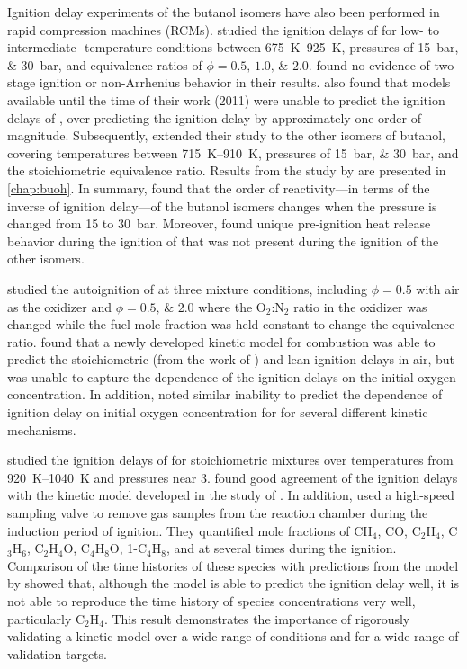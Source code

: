 \documentclass[../main.tex]{subfiles}
\begin{document}
Ignition delay experiments of the butanol isomers have also been
performed in rapid compression machines (RCMs). \textcite{Weber2011}
studied the ignition delays of \nBuOH{} for low- to intermediate-%
temperature conditions between \SIrange{675}{925}{\kelvin}, pressures of
\SIlist{15;30}{\bar}, and equivalence ratios of $\phi = \numlist{0.5;1.0;2.0}$.
\textcite{Weber2011} found no evidence of two-stage ignition or
non-Arrhenius behavior in their results. \textcite{Weber2011} also found
that models available until the time of their work (2011) were unable
to predict the ignition delays of \nBuOH{}, over-predicting
the ignition delay by approximately one order of magnitude. Subsequently,
\textcite{Weber2013} extended their study to the other isomers of
butanol, covering temperatures between \SIrange{715}{910}{\kelvin},
pressures of \SIlist{15;30}{\bar}, and the stoichiometric equivalence
ratio. Results from the study by \textcite{Weber2013} are presented in
\autoref{chap:buoh}. In summary, \textcite{Weber2013} found that the order of
reactivity---in terms of the inverse of ignition delay---of the butanol
isomers changes when the pressure is changed from \num{15} to \SI{30}{\bar}.
Moreover, \textcite{Weber2013} found unique pre-ignition heat release
behavior during the ignition of \tBuOH{} that was not present
during the ignition of the other isomers.

\textcite{Weber2013a} studied the autoignition of \iBuOH{}
at three mixture conditions, including $\phi = 0.5$ with air as the
oxidizer and $\phi = \numlist{0.5;2.0}$ where the O$_2$:N$_2$
ratio in the oxidizer was changed while the fuel mole fraction was held constant
to change the equivalence ratio. \textcite{Weber2013a} found that
a newly developed kinetic model for \iBuOH{} combustion
was able to predict the stoichiometric (from the work of \textcite{Weber2013})
and lean ignition delays in air, but was unable to capture the
dependence of the ignition delays on the initial oxygen concentration.
In addition, \textcite{Weber2011, Zhu2014} noted similar inability to predict
the dependence of ignition delay on initial oxygen concentration for
\nBuOH{} for several different kinetic mechanisms.

\textcite{Karwat2011a} studied the ignition delays of \nBuOH{}
for stoichiometric mixtures over temperatures from \SIrange{920}{1040}{\kelvin}
and pressures near \SI{3}{\atmosphere}. \textcite{Karwat2011a} found good
agreement of the ignition delays with the kinetic model developed in the
study of \textcite{Black2010}. In addition, \textcite{Karwat2011a} used
a high-speed sampling valve to remove gas samples from the reaction chamber
during the induction period of \nBuOH{} ignition. They quantified
mole fractions of CH$_4$, CO, C$_2$H$_4$, C$_3$H$_6$, C$_2$H$_4$O, C$_4$H$_8$O,
1-C$_4$H$_8$, and \nBuOH{} at several times during the ignition.
Comparison of the time histories of these species with predictions from
the model by \textcite{Black2010} showed that, although the model is able
to predict the ignition delay well, it is not able to reproduce the time history
of species concentrations very well, particularly C$_2$H$_4$. This result
demonstrates the importance of rigorously validating a kinetic model over
a wide range of conditions and for a wide range of validation targets.
\end{document}
